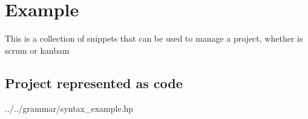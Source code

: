 \section{Example}
\label{sec:bnf}
This is a collection of snippets that can be used to manage a project, whether is scrum or kanbam

\subsection {Project represented as code}
 {../../grammar/syntax_example.hp}
